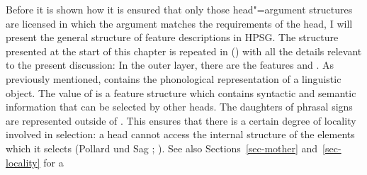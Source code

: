 Before it is shown how it is ensured that only those head"=argument structures are licensed in which the argument matches the requirements of the head, I will
present the general structure of feature descriptions in HPSG. The structure presented at the start of this chapter is repeated in () with all the details
relevant to the present discussion:
\ea
\label{LE-Grammatik}
\z
In the outer layer, there are the features \phon and \synsem. As previously mentioned, \phon contains the phonological representation of a linguistic
object. The value of \synsem is a feature structure which contains syntactic and semantic information that can be selected by other heads.
The daughters of phrasal signs are represented outside of \synsem. This ensures that there is a
certain degree of locality involved in selection: a head cannot access the internal
structure of the elements which it selects (Pollard und Sag \citeyear[--145]{ps};
\citeyear[]{ps2}). See also Sections~\ref{sec-mother} and~\ref{sec-locality} for a
